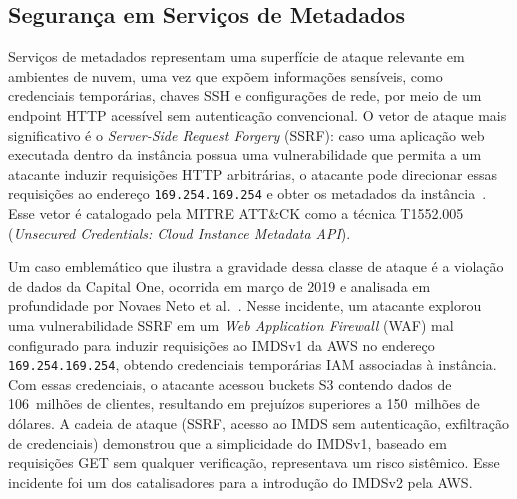 \subsection{Segurança em Serviços de Metadados}

Serviços de metadados representam uma superfície de ataque relevante em ambientes de nuvem, uma vez que expõem informações sensíveis, como credenciais temporárias, chaves SSH e configurações de rede, por meio de um endpoint HTTP acessível sem autenticação convencional. O vetor de ataque mais significativo é o \textit{Server-Side Request Forgery} (SSRF): caso uma aplicação web executada dentro da instância possua uma vulnerabilidade que permita a um atacante induzir requisições HTTP arbitrárias, o atacante pode direcionar essas requisições ao endereço \texttt{169.254.169.254} e obter os metadados da instância~\citep{mitre_t1552_005}. Esse vetor é catalogado pela MITRE ATT\&CK como a técnica T1552.005 (\textit{Unsecured Credentials: Cloud Instance Metadata API}).

Um caso emblemático que ilustra a gravidade dessa classe de ataque é a violação de dados da Capital One, ocorrida em março de 2019 e analisada em profundidade por Novaes Neto et al.~\citeyearpar{novaes2020capital}. Nesse incidente, um atacante explorou uma vulnerabilidade SSRF em um \textit{Web Application Firewall} (WAF) mal configurado para induzir requisições ao IMDSv1 da AWS no endereço \texttt{169.254.169.254}, obtendo credenciais temporárias IAM associadas à instância. Com essas credenciais, o atacante acessou buckets S3 contendo dados de 106~milhões de clientes, resultando em prejuízos superiores a 150~milhões de dólares. A cadeia de ataque (SSRF, acesso ao IMDS sem autenticação, exfiltração de credenciais) demonstrou que a simplicidade do IMDSv1, baseado em requisições GET sem qualquer verificação, representava um risco sistêmico. Esse incidente foi um dos catalisadores para a introdução do IMDSv2 pela AWS.

